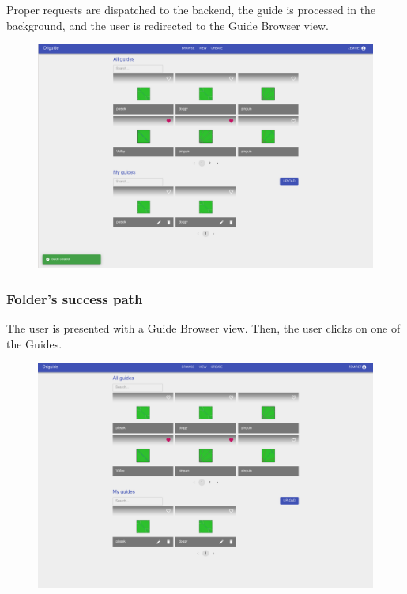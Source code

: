 Proper requests are dispatched to the backend, the guide is processed in the background, and
the user is redirected to the Guide Browser view.

\begin{figure}[H]
  	\centering
    \includegraphics[width=\textwidth]{assets/5-designerBrowser.png}
\end{figure}

\subsubsection{Folder's success path}

The user is presented with a Guide Browser view. Then, the user clicks on one of the Guides.

\begin{figure}[H]
  	\centering
    \includegraphics[width=\textwidth]{assets/5-folderOpen.png}
\end{figure}

